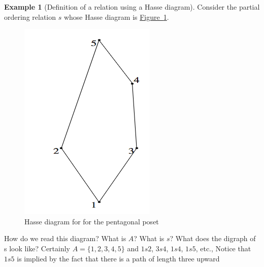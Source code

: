 \documentclass[10pt,]{book}
\theoremstyle{plain}
\theoremstyle{definition}
\theoremstyle{definition}
\theoremstyle{definition}
\newtheorem{example}[theorem]{Example}
\theoremstyle{definition}
\begin{document}
\begin{example}[Definition of a relation using a Hasse diagram]\label{ex-def-by-hasse}
Consider the partial ordering relation \(s\) whose Hasse diagram is \hyperref[fig-pentagonal-hasse]{Figure~\ref{fig-pentagonal-hasse}}.%
\leavevmode%
\begin{figure}
\centering
\includegraphics[width=1\linewidth]{images/pentagonal-hasse.png}
\caption{Hasse diagram for for the pentagonal poset
                \label{fig-pentagonal-hasse}}
\end{figure}
\par
How do we read this diagram? What is \(A\)? What is \(s\)? What does the digraph of s look like? Certainly \(A = \{1,2,3,4,5\}\) and
\(1 s 2\), \(3 s 4\), \(1 s 4\), \(1 s 5\), etc., Notice that \(1 s 5\) is implied by the fact that there is a path of length three upward

\end{example}
\end{document}
